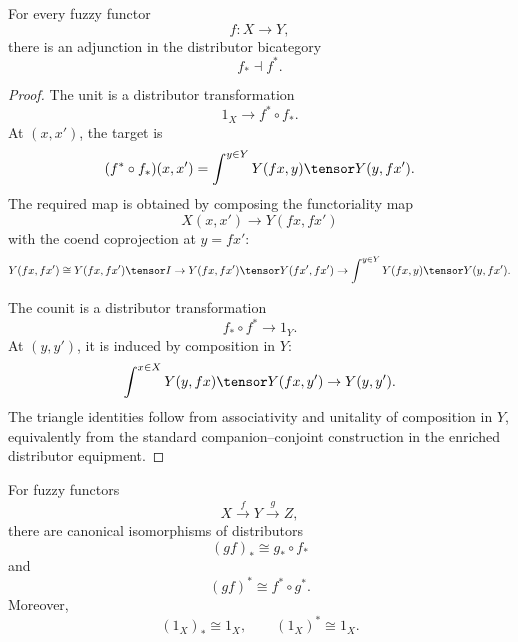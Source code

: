 \begin{proposition}
\label{prop:companion-conjoint-adjunction}
For every fuzzy functor
\[
    f:X\to Y,
\]
there is an adjunction in the distributor bicategory
\[
    f_\ast\dashv f^\ast.
\]
\end{proposition}

\begin{proof}
The unit is a distributor transformation
\[
    1_X\to f^\ast\circ f_\ast.
\]
At \((x,x')\), the target is
\[
    (f^\ast\circ f_\ast)(x,x')
    =
    \int^{y\in Y}
        Y(fx,y)\tensor Y(y,fx').
\]
The required map is obtained by composing the functoriality map
\[
    X(x,x')\to Y(fx,fx')
\]
with the coend coprojection at \(y=fx'\):
\[
    Y(fx,fx')
    \cong
    Y(fx,fx')\tensor I
    \to
    Y(fx,fx')\tensor Y(fx',fx')
    \to
    \int^{y\in Y}
        Y(fx,y)\tensor Y(y,fx').
\]

The counit is a distributor transformation
\[
    f_\ast\circ f^\ast\to 1_Y.
\]
At \((y,y')\), it is induced by composition in \(Y\):
\[
    \int^{x\in X}
        Y(y,fx)\tensor Y(fx,y')
    \to
    Y(y,y').
\]
The triangle identities follow from associativity and unitality of composition in
\(Y\), equivalently from the standard companion--conjoint construction in the
enriched distributor equipment.
\end{proof}

\begin{proposition}
\label{prop:companion-conjoint-functoriality}
For fuzzy functors
\[
    X\xrightarrow{f}Y\xrightarrow{g}Z,
\]
there are canonical isomorphisms of distributors
\[
    (gf)_\ast
    \cong
    g_\ast\circ f_\ast
\]
and
\[
    (gf)^\ast
    \cong
    f^\ast\circ g^\ast.
\]
Moreover,
\[
    (1_X)_\ast\cong 1_X,
    \qquad
    (1_X)^\ast\cong 1_X.
\]
\end{proposition}

